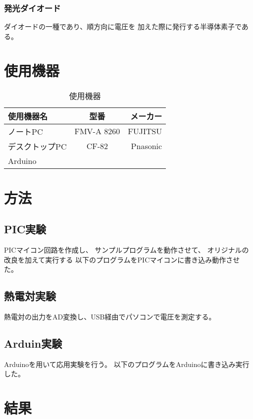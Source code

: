 \documentclass{jsarticle}
\begin{document}
\subsubsection{発光ダイオード}
ダイオードの一種であり、順方向に電圧を
加えた際に発行する半導体素子である。

\section{使用機器}
\begin{table}[thbp]
		\caption{使用機器}
		\centering
		\label{kiki}
		\begin{tabular}{|l|c|r|}\hline
				使用機器名&型番&メーカー \\ \hline
				ノートPC&FMV-A 8260&FUJITSU \\ \hline
				デスクトップPC&CF-82&Pnasonic \\ \hline
				Arduino&& \\ \hline
		\end{tabular}
\end{table}

\section{方法}
\subsection{PIC実験}
PICマイコン回路を作成し、
サンプルプログラムを動作させて、
オリジナルの改良を加えて実行する
以下のプログラムをPICマイコンに書き込み動作させた。




\subsection{熱電対実験}
熱電対の出力をAD変換し、USB経由でパソコンで電圧を測定する。

\subsection{Arduin実験}
Arduinoを用いて応用実験を行う。
以下のプログラムをArduinoに書き込み実行した。


\section{結果}
\end{document}
